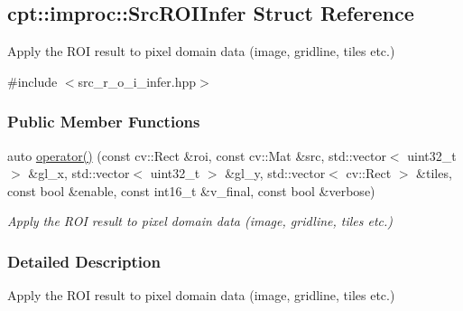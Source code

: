 \hypertarget{structcpt_1_1improc_1_1_src_r_o_i_infer}{\subsection{cpt\-:\-:improc\-:\-:Src\-R\-O\-I\-Infer Struct Reference}
\label{structcpt_1_1improc_1_1_src_r_o_i_infer}
}


Apply the R\-O\-I result to pixel domain data (image, gridline, tiles etc.)  




{\ttfamily \#include $<$src\-\_\-r\-\_\-o\-\_\-i\-\_\-infer.\-hpp$>$}

\subsubsection*{Public Member Functions}
\begin{DoxyCompactItemize}
\item 
auto \hyperlink{structcpt_1_1improc_1_1_src_r_o_i_infer_a07ad9c12bd9852a1e0d41bc639c20fd2}{operator()} (const cv\-::\-Rect \&roi, const cv\-::\-Mat \&src, std\-::vector$<$ uint32\-\_\-t $>$ \&gl\-\_\-x, std\-::vector$<$ uint32\-\_\-t $>$ \&gl\-\_\-y, std\-::vector$<$ cv\-::\-Rect $>$ \&tiles, const bool \&enable, const int16\-\_\-t \&v\-\_\-final, const bool \&verbose)
\begin{DoxyCompactList}\small\item\em Apply the R\-O\-I result to pixel domain data (image, gridline, tiles etc.) \end{DoxyCompactList}\end{DoxyCompactItemize}


\subsubsection{Detailed Description}
Apply the R\-O\-I result to pixel domain data (image, gridline, tiles etc.) 


